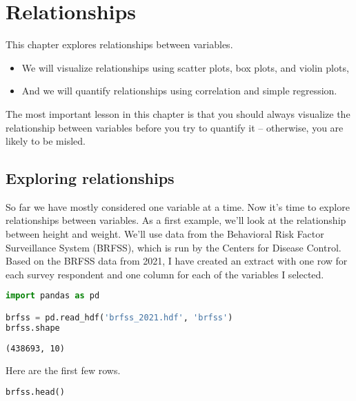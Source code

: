 \chapter{Relationships}\label{relationships}

This chapter explores relationships between variables.

\begin{itemize}
\item
  We will visualize relationships using scatter plots, box plots, and
  violin plots,
\item
  And we will quantify relationships using correlation and simple
  regression.
\end{itemize}

The most important lesson in this chapter is that you should always
visualize the relationship between variables before you try to quantify
it -- otherwise, you are likely to be misled.

\section{Exploring relationships}\label{exploring-relationships}

So far we have mostly considered one variable at a time. Now it's time
to explore relationships between variables. As a first example, we'll
look at the relationship between height and weight. We'll use data from
the Behavioral Risk Factor Surveillance System (BRFSS), which is run by
the Centers for Disease Control. Based on the BRFSS data from 2021, I
have created an extract with one row for each survey respondent and one
column for each of the variables I selected.

\begin{lstlisting}[language=Python,style=source]
import pandas as pd

brfss = pd.read_hdf('brfss_2021.hdf', 'brfss')
brfss.shape
\end{lstlisting}

\begin{lstlisting}[style=output]
(438693, 10)
\end{lstlisting}

\pagebreak

Here are the first few rows.

\begin{lstlisting}[language=Python,style=source]
brfss.head()
\end{lstlisting}



